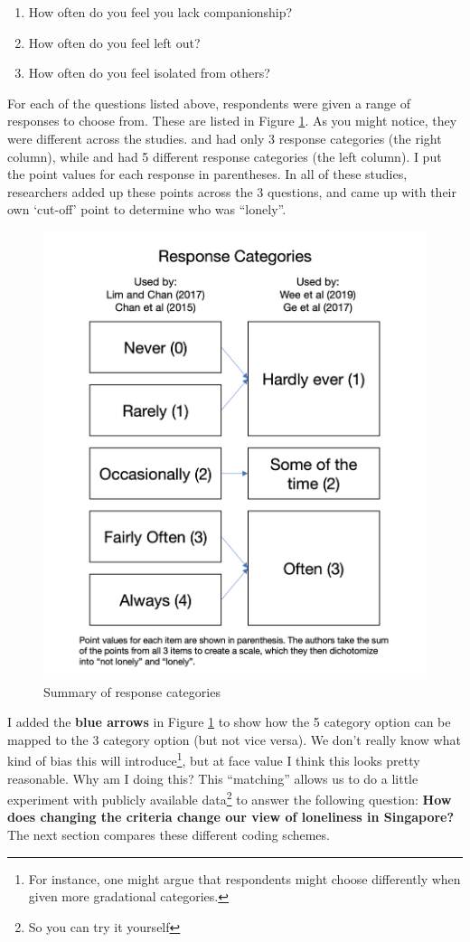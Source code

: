 \documentclass[openany]{book}
\providecommand{\tightlist}{%
  \setlength{\itemsep}{0pt}\setlength{\parskip}{0pt}}
\let\rmarkdownfootnote\footnote%
\def\footnote{\protect\rmarkdownfootnote}
\begin{document}
\begin{enumerate}
\def\labelenumi{\arabic{enumi}.}
\tightlist
\item
  How often do you feel you lack companionship?
\item
  How often do you feel left out?
\item
  How often do you feel isolated from others?
\end{enumerate}

For each of the questions listed above, respondents were given a range
of responses to choose from. These are listed in Figure
\ref{fig:st-lonely-graph}. As you might notice, they were different
across the studies. \citet{wee_loneliness_2019} and
\citet{ge_social_2017} had only 3 response categories (the right
column), while \citet{lim_association_2017} and
\citet{chan_loneliness_2015} had 5 different response categories (the
left column). I put the point values for each response in parentheses.
In all of these studies, researchers added up these points across the 3
questions, and came up with their own `cut-off' point to determine who
was ``lonely''.

\begin{figure}

{\centering \includegraphics[width=0.5\linewidth]{images/loneliness/lonely_graph} 

}

\caption{Summary of response categories}\label{fig:st-lonely-graph}
\end{figure}

I added the \textbf{blue arrows} in Figure \ref{fig:st-lonely-graph} to
show how the 5 category option can be mapped to the 3 category option
(but not vice versa). We don't really know what kind of bias this will
introduce\footnote{For instance, one might argue that respondents might
  choose differently when given more gradational categories.}, but at
face value I think this looks pretty reasonable. Why am I doing this?
This ``matching'' allows us to do a little experiment with publicly
available data\footnote{So you can try it yourself} to answer the
following question: \textbf{How does changing the criteria change our
view of loneliness in Singapore?} The next section compares these
different coding schemes.
\end{document}
